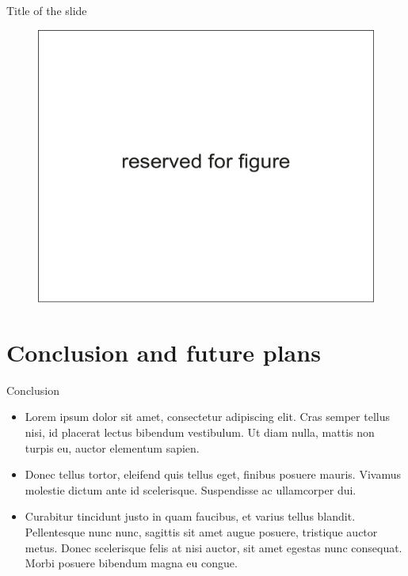 \documentclass[russian,12pt,aspectratio=169,xcolor=table]{beamer}
\begin{document}
\begin{frame}{Title of the slide}
\begin{minipage}{.32\textwidth}
	\end{minipage}
	\begin{minipage}{.32\textwidth}
		\begin{figure}
		\centering
		\includegraphics[width=\textwidth]{img/5}
		\end{figure}
	\end{minipage}
\end{frame}

\section{Conclusion and future plans}
	
\begin{frame}{Conclusion}
	\begin{itemize}
		\item Lorem ipsum dolor sit amet, consectetur adipiscing elit. Cras semper tellus nisi, id placerat lectus bibendum vestibulum. Ut diam nulla, mattis non turpis eu, auctor elementum sapien.
		\item Donec tellus tortor, eleifend quis tellus eget, finibus posuere mauris. Vivamus molestie dictum ante id scelerisque. Suspendisse ac ullamcorper dui.
		\item Curabitur tincidunt justo in quam faucibus, et varius tellus blandit. Pellentesque nunc nunc, sagittis sit amet augue posuere, tristique auctor metus. Donec scelerisque felis at nisi auctor, sit amet egestas nunc consequat. Morbi posuere bibendum magna eu congue.
	\end{itemize}
\end{frame}
\end{document}
